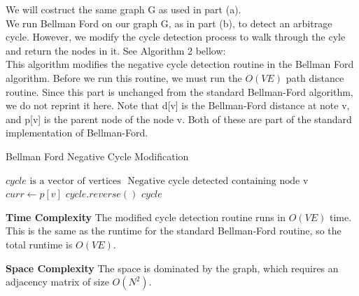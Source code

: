\documentclass[11pt]{article}
\begin{document}
\begin{solution} We will costruct the same graph G as used in part (a).\\ 

We run Bellman Ford on our graph G, as in part (b), to detect an arbitrage cycle. However, we modify the cycle detection process to walk through the cyle and return the nodes in it. See Algorithm 2 bellow: \\

This algorithm modifies the negative cycle detection routine in the Bellman Ford algorithm. Before we run this routine, we must run the $O(VE)$ path distance routine. Since this part is unchanged from the standard Bellman-Ford algorithm, we do not reprint it here. Note that d[v] is the Bellman-Ford distance at note v, and p[v] is the parent node of the node v. Both of these are part of the standard implementation of Bellman-Ford.

\begin{algorithm}
\caption{Bellman Ford Negative Cycle Modification}
\begin{algorithmic}
\STATE $cycle \text{ is a vector of vertices}$
\STATE $\text{ Negative cycle detected containing node v}$
\STATE $curr \gets p[v]$
\ENDWHILE
\ENDIF
\ENDFOR
\STATE $cycle.reverse()$
\RETURN $cycle$
\end{algorithmic}
\end{algorithm} 


\textbf{Time Complexity} The modified cycle detection routine runs in $O(VE)$ time. This is the same as the runtime for the standard Bellman-Ford routine, so the total runtime is $O(VE)$.

\textbf{Space Complexity} The space is dominated by the graph, which requires an adjacency matrix of size $O(N^2)$.


\end{solution}
\end{document}
